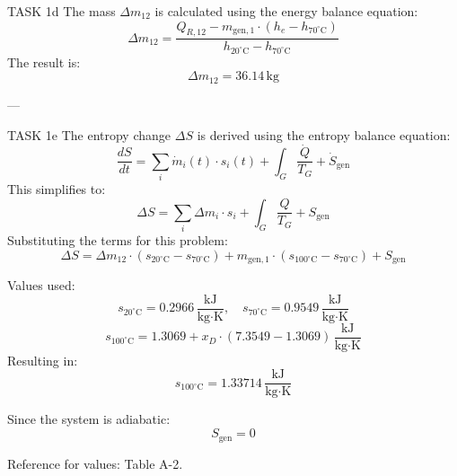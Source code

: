 TASK 1d  
The mass \( \Delta m_{12} \) is calculated using the energy balance equation:  
\[
\Delta m_{12} = \frac{Q_{R,12} - m_{\text{gen},1} \cdot (h_{e} - h_{70^\circ\text{C}})}{h_{20^\circ\text{C}} - h_{70^\circ\text{C}}}
\]  
The result is:  
\[
\Delta m_{12} = 36.14 \, \text{kg}
\]  

---

TASK 1e  
The entropy change \( \Delta S \) is derived using the entropy balance equation:  
\[
\frac{dS}{dt} = \sum_i \dot{m}_i(t) \cdot s_i(t) + \int_G \frac{\dot{Q}}{T_G} + \dot{S}_{\text{gen}}
\]  
This simplifies to:  
\[
\Delta S = \sum_i \Delta m_i \cdot s_i + \int_G \frac{Q}{T_G} + S_{\text{gen}}
\]  
Substituting the terms for this problem:  
\[
\Delta S = \Delta m_{12} \cdot (s_{20^\circ\text{C}} - s_{70^\circ\text{C}}) + m_{\text{gen},1} \cdot (s_{100^\circ\text{C}} - s_{70^\circ\text{C}}) + S_{\text{gen}}
\]  

Values used:  
\[
s_{20^\circ\text{C}} = 0.2966 \, \frac{\text{kJ}}{\text{kg·K}}, \quad s_{70^\circ\text{C}} = 0.9549 \, \frac{\text{kJ}}{\text{kg·K}}
\]  
\[
s_{100^\circ\text{C}} = 1.3069 + x_D \cdot (7.3549 - 1.3069) \, \frac{\text{kJ}}{\text{kg·K}}
\]  
Resulting in:  
\[
s_{100^\circ\text{C}} = 1.33714 \, \frac{\text{kJ}}{\text{kg·K}}
\]  

Since the system is adiabatic:  
\[
S_{\text{gen}} = 0
\]  

Reference for values: Table A-2.